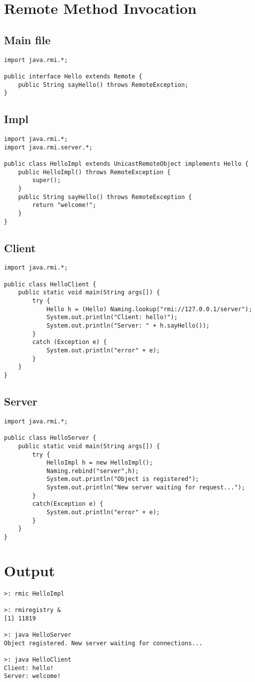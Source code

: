 \pagebreak{}
\section{Remote Method Invocation}
\subsection{Main file}
\begin{verbatim}
import java.rmi.*;

public interface Hello extends Remote {
    public String sayHello() throws RemoteException;
}
\end{verbatim}

\subsection{Impl}
\begin{verbatim}
import java.rmi.*;
import java.rmi.server.*;

public class HelloImpl extends UnicastRemoteObject implements Hello {
    public HelloImpl() throws RemoteException {
        super();
    }
    public String sayHello() throws RemoteException {
        return "welcome!";
    }
}
\end{verbatim}

\subsection{Client}
\begin{verbatim}
import java.rmi.*;

public class HelloClient {
    public static void main(String args[]) {
        try {
            Hello h = (Hello) Naming.lookup("rmi://127.0.0.1/server");
            System.out.println("Client: hello!");
            System.out.println("Server: " + h.sayHello());
        }
        catch (Exception e) {
            System.out.println("error" + e);
        }
    }
}
\end{verbatim}
\pagebreak{}
\subsection{Server}
\begin{verbatim}
import java.rmi.*;

public class HelloServer {
    public static void main(String args[]) {
        try {
            HelloImpl h = new HelloImpl();
            Naming.rebind("server",h);
            System.out.println("Object is registered");
            System.out.println("New server waiting for request...");
        }
        catch(Exception e) {
            System.out.println("error" + e);
        }
    }
}
\end{verbatim}

\section*{Output}
\begin{verbatim}
>: rmic HelloImpl

>: rmiregistry &
[1] 11819

>: java HelloServer
Object registered. New server waiting for connections...

>: java HelloClient
Client: hello!
Server: welcome!
\end{verbatim}
